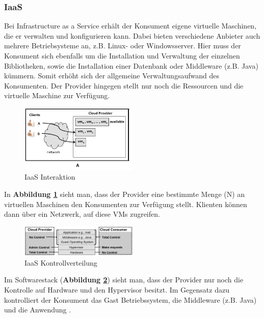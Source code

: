 \subsubsection{IaaS}
Bei Infrastructure as a Service erhält der Konsument eigene virtuelle Maschinen, die er verwalten und konfigurieren kann. Dabei bieten verschiedene Anbieter auch mehrere Betriebsysteme an, z.B.
Linux- oder Windowsserver. Hier muss der Konsument sich ebenfalls um die Installation und Verwaltung der einzelnen Bibliotheken, sowie die Installation einer Datenbank oder Middleware (z.B. Java) kümmern.
Somit erhöht sich der allgemeine Verwaltungsaufwand des Konsumenten. Der Provider hingegen stellt nur noch die Ressourcen und die virtuelle Maschine zur Verfügung. 
\begin{figure}[h]
    \centering
	\includegraphics[width=0.5\textwidth]{Images/IaaSInteraction}
	\caption{IaaS Interaktion \cite{Badger}}
	\label{IaaSInteraction}
\end{figure}
In \textbf{Abbildung \ref{IaaSInteraction}} sieht man, dass der Provider eine bestimmte Menge (N) an virtuellen Maschinen den Konsumenten zur Verfügung stellt. Klienten können dann über ein Netzwerk, auf diese VMs zugreifen.
\begin{figure}[h]
    \centering
	\includegraphics[width=0.5\textwidth]{Images/IaaSControl}
	\caption{IaaS Kontrollverteilung \cite{Badger}}
	\label{IaaSControl}
\end{figure}
Im Softwarestack (\textbf{Abbildung \ref{IaaSControl}}) sieht man, dass der Provider nur noch die Kontrolle auf Hardware und den Hypervisor besitzt.
Im Gegensatz dazu kontrolliert der Konsument das Gast Betriebssystem, die Middleware (z.B. Java) und die Anwendung \cite{Badger}.

